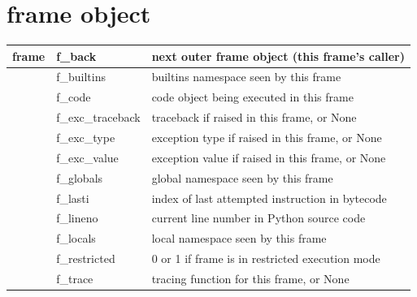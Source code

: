 \documentclass{icldt}
\numberwithin{equation}{section}       %
\begin{document}
{{\section{frame object}
\begin{tabularx}{\textwidth}{ |l|l|X| }
    \hline
    frame & f_back & next outer frame object (this frame’s caller) \\
   	\hline
    & f_builtins & builtins namespace seen by this frame \\
   	\hline
	& f_code & code object being executed in this frame \\
   	\hline
	& f_exc_traceback & traceback if raised in this frame, or \textsf{None} \\
   	\hline
	& f_exc_type & exception type if raised in this frame, or \textsf{None} \\
   	\hline
	& f_exc_value & exception value if raised in this frame, or \textsf{None} \\
   	\hline
	& f_globals & global namespace seen by this frame \\
   	\hline
	& f_lasti & index of last attempted instruction in bytecode \\
   	\hline
	& f_lineno & current line number in Python source code \\
   	\hline
	& f_locals & local namespace seen by this frame \\
   	\hline
	& f_restricted & 0 or 1 if frame is in restricted execution mode \\
   	\hline
	& f_trace & tracing function for this frame, or \textsf{None} \\
   	\hline
\end{tabularx}
}}
\end{document}
